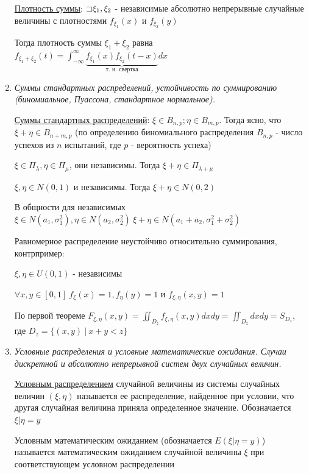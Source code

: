 \documentclass[12pt]{article}
\begin{document}
\begin{enumerate}
    \hyperlink{convolutionformula}{Плотность суммы}: \Ths $\mathord{\sqsupset} \xi_1, \xi_2$ - независимые абсолютно непрерывные случайные величины с плотностями
    $f_{\xi_1}(x)$ и $f_{\xi_2}(y)$

    Тогда плотность суммы $\xi_1 + \xi_2$ равна $f_{\xi_1 + \xi_2}(t) = \int_{-\infty}^\infty 
    \underset{\text{т. н. свертка}}{\underbrace{f_{\xi_1}(x) f_{\xi_2}(t - x)}} dx$

    \item \textit{Суммы стандартных распределений, устойчивость по суммированию (биномиальное, Пуассона, стандартное нормальное).}

    \hyperlink{sumofstandarddistributions}{Суммы стандартных распределений}: 
     $\xi \in B_{n, p}; \eta \in B_{m, p}$. Тогда ясно, что $\xi + \eta \in B_{n + m, p}$ 
    (по определению биномиального распределения $B_{n, p}$ - число успехов из $n$ испытаний, где $p$ - вероятность успеха)

     $\xi \in \Pi_{\lambda}, \eta \in \Pi_{\mu}$, они независимы. Тогда $\xi + \eta \in \Pi_{\lambda + \mu}$

     $\xi, \eta \in N(0, 1)$ и независимы. Тогда $\xi + \eta \in N(0, 2)$

     В общности для независимых $\xi \in N(a_1, \sigma^2_1), \eta \in N(a_2, \sigma_2^2) \ \xi + \eta \in N(a_1 + a_2, \sigma_1^2 + \sigma_2^2)$ 

     Равномерное распределение неустойчиво относительно суммирования, контрпример:

    $\xi, \eta \in U(0, 1)$ - независимы

    $\forall x, y \in [0, 1] \ f_{\xi}(x) = 1, f_\eta(y) = 1$ и $f_{\xi, \eta}(x, y) = 1$

    По первой теореме $F_{\xi, \eta}(x, y) = \iint_{D_z} f_{\xi, \eta}(x, y) dxdy = \iint_{D_z} dxdy = S_{D_z}$, где $D_z = \{(x, y) \ | \ x + y < z\}$

    \item \textit{Условные распределения и условные математические ожидания. Случаи дискретной и абсолютно непрерывной систем двух случайных величин.}

    \hyperlink{conditionaldistribution}{Условным распределением} случайной величины из системы случайных величин $(\xi, \eta)$ 
    называется ее распределение, найденное при условии, что другая случайная величина приняла 
    определенное значение. Обозначается $\xi | \eta = y$

    Условным математическим ожиданием (обозначается $E(\xi | \eta = y)$) называется 
    математическим ожиданием случайной величины $\xi$ при соответствующем условном распределении
 

\end{enumerate}
\end{document}
